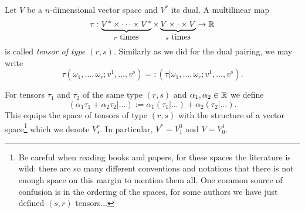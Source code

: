 \begin{definition}
  Let $V$ be a $n$-dimensional vector space and $V^*$ its dual.
  A multilinear map
  \begin{equation}
    \tau : \LaTeXunderbrace{V^*\times \cdots \times V^*}_{r\mbox{ times}} \times \LaTeXunderbrace{V \times \cdot \times V}_{s\mbox{ times}} \to \R
  \end{equation}
  is called \emph{tensor of type $(r,s)$}. Similarly as we did for the dual pairing, we may write
  \begin{equation}
    \tau(\omega_1, \ldots, \omega_r; v^1, \ldots, v^s) =: \left(\tau | \omega_1, \ldots, \omega_r; v^1, \ldots, v^s \right).
  \end{equation}

  For tensors $\tau_1$ and $\tau_2$ of the same type $(r,s)$ and $\alpha_1, \alpha_2\in\mathbb{R}$ we define
  \begin{equation}
    \left(\alpha_1\tau_1 + \alpha_2\tau_2 | \ldots \right) := \alpha_1\left(\tau_1 | \ldots \right) + \alpha_2 \left(\tau_2 | \ldots \right).
  \end{equation}
  This equips the space of tensors of type $(r,s)$ with the structure of a vector space\footnote{Be careful when reading books and papers, for these spaces the literature is wild: there are so many different conventions and notations that there is not enough space on this margin to mention them all. One common source of confusion is in the ordering of the spaces, for some authors we have just defined $(s,r)$ tensors...} which we denote $V^r_s$. In particular, $V^* = V_1^0$ and $V=V_0^1$.
\end{definition}